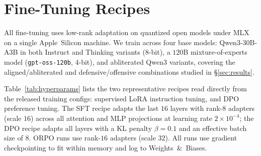\section{Fine-Tuning Recipes}
\label{sec:recipes}

All fine-tuning uses low-rank adaptation on quantized open models under MLX on
a single Apple~Silicon machine. We train across four base models: Qwen3-30B-A3B
in both Instruct and Thinking variants (8-bit), a $120$B mixture-of-experts
model (\texttt{gpt-oss-120b}, 4-bit), and abliterated Qwen3
variants, covering the aligned/abliterated and defensive/offensive
combinations studied in \S\ref{sec:results}.

Table~\ref{tab:hyperparams} lists the two representative recipes read directly
from the released training configs: supervised LoRA instruction tuning, and
DPO preference tuning. The SFT recipe adapts the last $16$ layers with rank-$8$
adapters (scale $16$) across all attention and MLP projections at learning
rate $2\times10^{-4}$; the DPO recipe adapts all layers with a KL penalty
$\beta=0.1$ and an effective batch size of $8$. ORPO runs use rank-$16$
adapters (scale $32$). All runs use gradient checkpointing to fit within
memory and log to Weights~\&~Biases.


